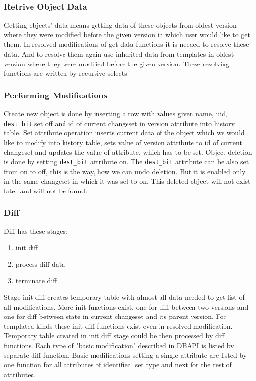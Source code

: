 \documentclass[deska]{subfiles}
\begin{document}
\subsubsection{Retrive Object Data}
Getting objects' data means getting data of these objects from oldest version where they were modified before the given version in which user would like to get them.
In resolved modifications of get data functions it is needed to resolve these data. And to resolve them again use inherited data from templates in oldest version where they were modified before the given version.
These resolving functions are written by recursive selects.

\subsubsection{Performing Modifications}
Create new object is done by inserting a row with values given name, uid, {\tt dest\_bit} set off and id of current changeset in version attribute into history table.
Set attribute operation inserts current data of the object which we would like to modify into history table, sets value of version attribute to id of current changeset and updates the value of attribute, which has to be set.
Object deletion is done by setting {\tt dest\_bit} attribute on.
The {\tt dest\_bit} attribute can be also set from on to off, this is the way, how we can undo deletion. But it is enabled only in the same changeset in which it was set to on. This deleted object will not exist later and will not be found.

\subsubsection{Diff}

Diff has these stages:
\begin{enumerate}
    \item init diff
    \item process diff data
    \item terminate diff
\end{enumerate}
Stage init diff creates temporary table with almost all data needed to get list of all modifications.
More init functions exist, one for diff between two versions and one for diff between state in current changeset and its parent version. For templated kinds these init diff functions exist even in resolved modification.\\

Temporary table created in init diff stage could be then processed by diff functions. Each type of "basic modification" described in DBAPI is listed by separate diff function. Basic modifications setting a single attribute are listed by one function for all attributes of identifier\_set type and next for the rest of attributes.\\
\end{document}
